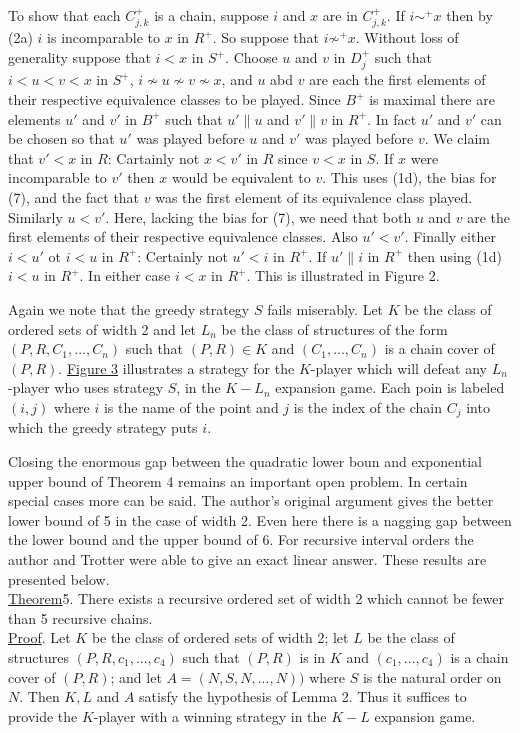 \documentclass[twoside]{article}
\begin{document}
To show that each $C^+_{j,k}$ is a chain, suppose $i$ and $x$ are in $C^+_{j,k}$. If $i\sim^+x$ then by (2a) $i$ is incomparable to $x$ in $R^+$.
So suppose that $i\not\sim^+x$. Without loss of generality suppose that $i<x$ in $S^+$. Choose $u$ and $v$ in $D^+_j$ such that $i<u<v<x$ in $S^+$,
$i \not\sim u \not\sim v \not\sim x$, and $u$ abd $v$ are each the first elements of their respective equivalence classes to be played. Since $B^+$
is maximal there are elements $u'$ and $v'$ in $B^+$ such that $u' \parallel u$ and $v' \parallel v$ in $R^+$. In fact $u'$ and $v'$
can be chosen so that $u'$ was played before $u$ and $v'$ was played before $v$. We claim that $v'<x$ in $R$: Cartainly not $x<v'$ in $R$ since
$v<x$ in $S$. If $x$ were incomparable to $v'$ then $x$ would be equivalent to $v$. This uses (1d), the bias for (7), and the fact that $v$
was the first element of its equivalence class played. Similarly $u < v'$. Here, lacking the bias for (7), we need that both $u$ and $v$
are the first elements of their respective equivalence classes. Also $u' < v'$. Finally either $i < u'$ ot $i<u$ in $R^+$: Certainly not
$u'<i$ in $R^+$. If $u' \parallel i$ in $R^+$ then using (1d) $i<u$ in $R^+$. In either case $i<x$ in $R^+$. This is illustrated in Figure 2. 

%
%
Again we note that the greedy strategy $S$ fails miserably. Let $K$ be the class of ordered sets of width 2 and let $L_n$ be the class of
structures of the form $(P,R,C_1,...,C_n)$ such that $(P,R) \in K$ and $(C_1,...,C_n)$ is a chain cover of $(P,R)$. \underline{Figure 3}
illustrates a strategy for the $K$-player which will defeat any $L_n$-player who uses strategy $S$, in the $K-L_n$ expansion game.
Each poin is labeled $(i,j)$ where $i$ is the name of the point and $j$ is the index of the chain $C_j$ into which the greedy strategy 
puts $i$.

Closing the enormous gap between the quadratic lower boun and exponential upper bound of Theorem 4 remains an important open problem. 
In certain special cases more can be said. The author's original argument gives the better lower bound of 5 in the case of width 2. 
Even here there is a nagging gap between the lower bound and the upper bound of 6. For recursive interval orders the author and Trotter
were able to give an exact linear answer. These results are presented below.\\
\newline
\underline{Theorem}5. \cite{Kierstead81a} There exists a recursive ordered set of width 2 which cannot be fewer than 5 recursive chains.\\
\newline
\underline{Proof}. Let $K$ be the class of ordered sets of width 2; let $L$ be the class of structures $(P,R,c_1,...,c_4)$
such that $(P,R)$ is in $K$ and $(c_1,...,c_4)$ is a chain cover of $(P,R)$; and let $A=(N,S,N,...,N))$ where $S$ is the natural order on $N$.
Then $K,L$ and $A$ satisfy the hypothesis of Lemma 2. Thus it suffices to provide the $K$-player with a winning strategy in the $K-L$ expansion
game.
\end{document}

